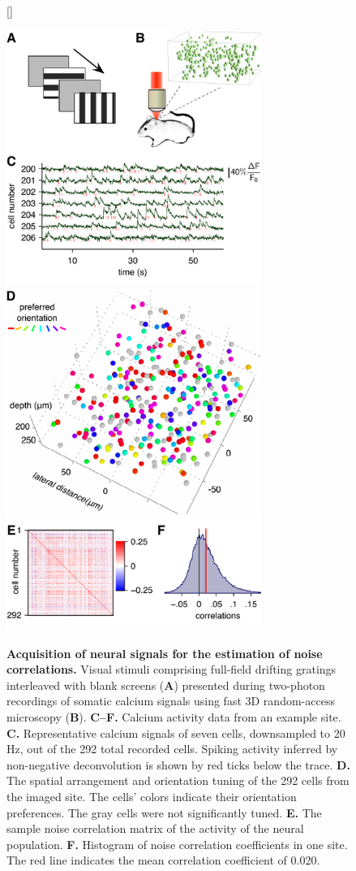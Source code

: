 \documentclass[10pt]{article}
\begin{document}
\begin{figure}    [\FBwidth]
    {\caption{{\bf Acquisition of neural signals for the estimation of noise correlations.}
    Visual stimuli comprising full-field drifting gratings interleaved with blank screens ({\bf A}) presented during two-photon recordings of somatic calcium signals using fast 3D random-access microscopy ({\bf B}). 
    {\bf C--F.} Calcium activity data from an example site.
    {\bf C.} Representative calcium signals of seven cells, downsampled to 20 Hz, out of the 292 total recorded cells. Spiking activity inferred by non-negative deconvolution is shown by red ticks below the trace.
    {\bf D.} The spatial arrangement and orientation tuning of the 292 cells from the imaged site. The cells' colors indicate their orientation preferences. The gray cells were not significantly tuned.
    {\bf E.} The sample noise correlation matrix of the activity of the neural population. 
    {\bf F.} Histogram of noise correlation coefficients in one site. The red line indicates the mean correlation coefficient of 0.020.
} \label{fig:2}}
    {\includegraphics[width=8.3cm]{figures/Figure02.pdf}}
\end{figure}
\end{document}
